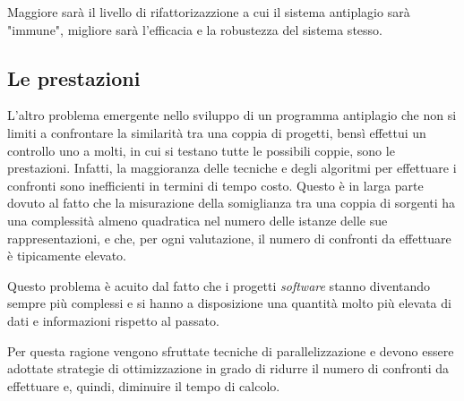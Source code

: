 Maggiore sarà il livello di rifattorizazzione a cui il sistema antiplagio sarà "immune", migliore sarà l'efficacia e la robustezza del sistema stesso.

\subsection{Le prestazioni}
L'altro problema emergente nello sviluppo di un programma antiplagio che non si limiti a confrontare la similarità tra una coppia di progetti, bensì effettui un controllo uno a molti, in cui si testano tutte le possibili coppie, sono le prestazioni. 
%
Infatti, la maggioranza delle tecniche e degli algoritmi per effettuare i confronti sono inefficienti in termini di tempo costo. 
%
Questo è in larga parte dovuto al fatto che la misurazione della somiglianza tra una coppia di sorgenti ha una complessità almeno quadratica nel numero delle istanze delle sue rappresentazioni, e che, per ogni valutazione, il numero di confronti da effettuare è tipicamente elevato.

Questo problema è acuito dal fatto che i progetti \textit{software} stanno diventando sempre più complessi e si hanno a disposizione una quantità molto più elevata di dati e informazioni rispetto al passato.

Per questa ragione vengono sfruttate tecniche di parallelizzazione e devono essere adottate strategie di ottimizzazione in grado di ridurre il numero di confronti da effettuare e, quindi, diminuire il tempo di calcolo.
